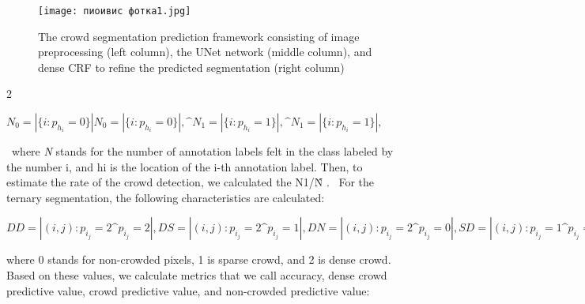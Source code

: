 \documentclass{article}
\begin{document}
\newpage
\begin{figure}
\setcounter{figure}{1}
    \centering
   
\texttt{[image: пиоивис фотка1.jpg]}

    \caption{ \small The crowd segmentation prediction framework consisting of image preprocessing (left column), the UNet network (middle column),
and dense CRF to refine the predicted segmentation (right column)\label{2}
}
    \end{figure}
         \begin{multicols}{2}
    \begin{centering}
    \begin{math} 
 N_0=|\{i : p_h_i=0\}|
 
  N_0=|\{i : p_h_i=0\}|,
  
  \^N_1=|\{i : p_h_i=1\}|,
  
  \^N_1=|\{i : p_h_i=1\}|,

       \end{math}
        \end{centering}
       \vspace{5mm}
\ where \textit{N} stands for the number of annotation labels felt 
in the class labeled by the number i, and hi 
is the location 
of the i-th annotation label. Then, to estimate the rate of 
the crowd detection, we calculated the N1/\^N .
\ For the ternary segmentation, the following characteristics are calculated:
\begin{centering}
   \begin{math}
   
   DD=|{(i,j):p_i_j=2\^p_i_j=2}|,
   
   DS=|{(i,j):p_i_j=2\^p_i_j=1}|,
   
   DN=|{(i,j):p_i_j=2\^p_i_j=0}|,
   
   SD=|{(i,j):p_i_j=1\^p_i_j=2}|,
   
   SS=|{(i,j):p_i_j=1\^p_i_j=1}|,
   
   SN=|{(i,j):p_i_j=1\^p_i_j=0}|,
   
   ND=|{(i,j):p_i_j=0\^p_i_j=2}|,
   
   NS=|{(i,j):p_i_j=0\^p_i_j=2}|,
   
   NN=|{(i,j):p_i_j=0\^p_i_j=0}|,

   \end{math}
      \end{centering}
   where 0 stands for non-crowded pixels, 1 is sparse crowd, 
and 2 is dense crowd. Based on these values, we calculate 
metrics that we call accuracy, dense crowd predictive 
value, crowd predictive value, and non-crowded predictive value:


\end{multicols}
\end{document}
